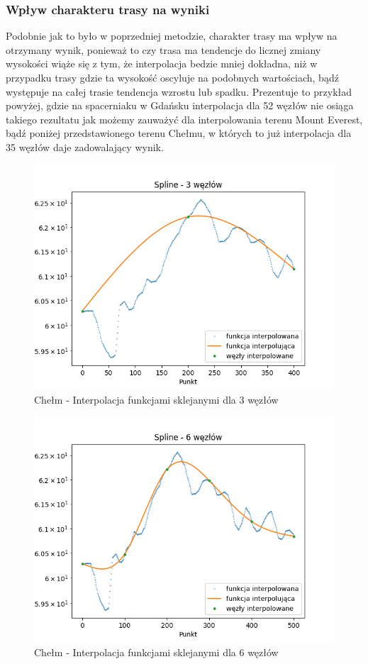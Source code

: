 \documentclass[12pt]{extarticle}
\begin{document}
\subsubsection*{Wpływ charakteru trasy na wyniki}
Podobnie jak to było w poprzedniej metodzie, charakter trasy ma wpływ na otrzymany wynik, ponieważ to czy trasa ma tendencje do licznej zmiany wysokości wiąże się z tym, że interpolacja bedzie mniej dokładna, niż w przypadku trasy gdzie ta wysokość oscyluje na podobnych wartościach, bądź występuje na całej trasie tendencja wzrostu lub spadku. Prezentuje to przykład powyżej, gdzie na spacerniaku w Gdańsku interpolacja dla 52 węzłów nie osiąga takiego rezultatu jak możemy zauważyć dla interpolowania terenu Mount Everest, bądź poniżej przedstawionego terenu Chełmu, w których to już interpolacja dla 35 węzłów daje zadowalający wynik.
\begin{figure}[H]
    \centering
    \includegraphics[scale=0.65]{interpolation_chelm_Spline_3.png}
    \caption{Chełm - Interpolacja funkcjami sklejanymi dla 3 węzłów}
\end{figure}
\begin{figure}[H]
    \centering
    \includegraphics[scale=0.65]{interpolation_chelm_Spline_6.png}
    \caption{Chełm - Interpolacja funkcjami sklejanymi dla 6 węzłów}
\end{figure}
\end{document}

